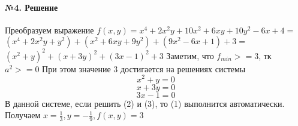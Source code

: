\documentclass{article}
\begin{document}
\paragraph{№4. Решение} \hspace{\fill{}}
\newline
\quad Преобразуем выражение
\newline
$f(x, y) = x^4 + 2x^2y + 10x^2 + 6xy + 10y^2 - 6x + 4 = $ 
\newline 
$(x^4 + 2x^2y + y^2) + (x^2+ 6xy + 9y^2) + (9x^2 - 6x + 1) + 3 = $ 
\newline 
$(x^2 + y)^2 + (x + 3y)^2 + (3x - 1)^2 + 3$
\newline 
Заметим, что $f_{min} >= 3$, тк $a^2 >= 0$
\newline
При этом значение 3 достигается на решениях системы
\newline
\begin{equation}
x^2 + y = 0 
\end{equation}
\begin{equation}
x + 3y = 0 
\end{equation}
\begin{equation}
3x - 1 = 0
\end{equation}
В данной системе, если решить (2) и (3), то (1) выполнится автоматически.
Получаем $x = \frac{1}{3}, y = -\frac{1}{9}, f(x, y) = 3$
\end{document}
